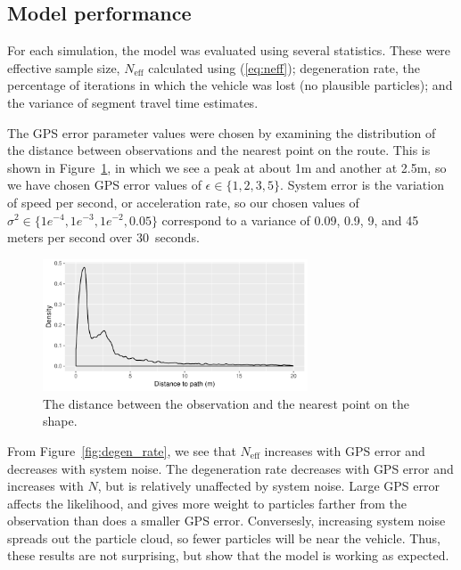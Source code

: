\subsection{Model performance}
\label{sec:model_perf}


For each simulation, 
the model was evaluated using several statistics.
These were effective sample size, $N_\text{eff}$ calculated using (\ref{eq:neff});
degeneration rate, the percentage of iterations in which the vehicle was lost
(no plausible particles);
and the variance of segment travel time estimates.


The GPS error parameter values were chosen by examining the distribution
of the distance between observations and the nearest point on the route.
This is shown in Figure~\ref{fig:dist_to_route},
in which we see a peak at about 1m and another at 2.5m,
so we have chosen GPS error values of $\epsilon \in \{1,2,3,5\}$.
System error is the variation of speed per second,
or acceleration rate,
so our chosen values of $\sigma^2\in \{1e^{-4},1e^{-3},1e^{-2},0.05\}$ 
correspond to a variance of 0.09, 0.9, 9, and 45 meters per second over 
30~seconds.


\begin{figure}[tb]
    \centering
    \includegraphics[width=0.7\textwidth]{figures/04_model_results_dist.pdf}
    \caption{The distance between the observation and the nearest point on the shape.}
    \label{fig:dist_to_route}
\end{figure}


From Figure~\ref{fig:degen_rate}, we see that $N_\text{eff}$ increases
with GPS error and decreases with system noise.
The degeneration rate decreases with GPS error and increases with $N$,
but is relatively unaffected by system noise.
Large GPS error affects the likelihood,
and gives more weight to particles farther from the observation
than does a smaller GPS error.
Conversesly, increasing system noise spreads out the particle cloud,
so fewer particles will be near the vehicle.
Thus, these results are not surprising, 
but show that the model is working as expected.


